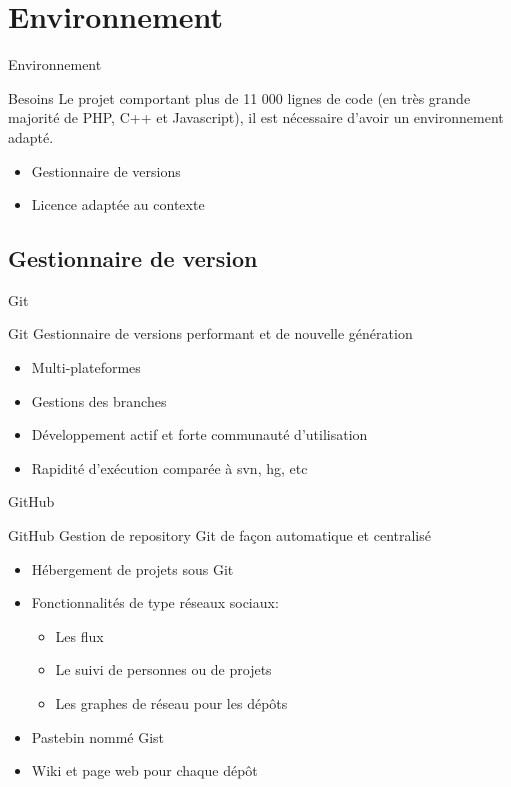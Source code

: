 \section{Environnement}
\begin{frame}{Environnement}
	\begin{block}{Besoins}
        Le projet comportant plus de 11 000 lignes de code (en très grande majorité
        de PHP, C++ et Javascript), il est nécessaire d'avoir un environnement 
        adapté.

	    \begin{itemize}
            \item Gestionnaire de versions
            \item Licence adaptée au contexte
	    \end{itemize}
	\end{block}
\end{frame}


\subsection{Gestionnaire de version}
\begin{frame}{Git}
	\begin{block}{Git}
        Gestionnaire de versions performant et de nouvelle génération

        \begin{itemize}
        \item Multi-plateformes
        \item Gestions des branches
        \item Développement actif et forte communauté d'utilisation
        \item Rapidité d'exécution comparée à svn, hg, etc
        \end{itemize}
	\end{block}
\end{frame}


\begin{frame}{GitHub}
	\begin{block}{GitHub}
    Gestion de repository Git de façon automatique et centralisé

        \begin{itemize}
        \item Hébergement de projets sous Git
        \item Fonctionnalités de type réseaux sociaux:
            \begin{itemize}
            \item Les flux
            \item Le suivi de personnes ou de projets
            \item Les graphes de réseau pour les dépôts
            \end{itemize}
        \item Pastebin nommé Gist
        \item Wiki et page web pour chaque dépôt
        \end{itemize}
    \end{block}
\end{frame}


